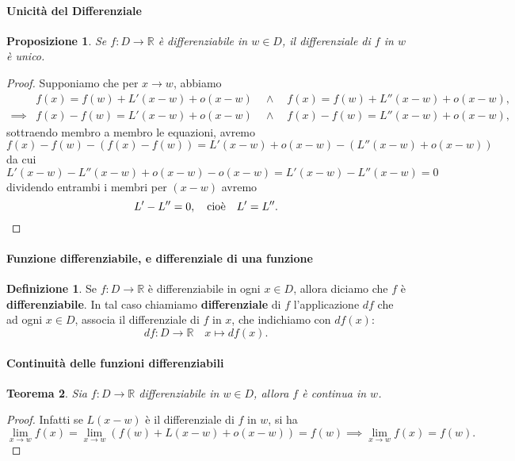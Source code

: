 \documentclass{article}
\theoremstyle{plain}
\newtheorem{thm}{Teorema}[section]
\newtheorem{prop}[thm]{Proposizione}
\theoremstyle{definition}
\newtheorem{defn}{Definizione}[section]
\theoremstyle{remark}
\begin{document}
\vspace{10pt}

\paragraph{Unicità del Differenziale}
\begin{bxthm}
\begin{prop}
    Se $f:D\to\mathbb{R}$ è differenziabile in $w\in D$, il differenziale di $f$ in $w$ è unico.
\end{prop}
\end{bxthm}
\begin{proof}
    Supponiamo che per $x\to w$, abbiamo 
    \begin{align*}
        &f(x)=f(w)+L'(x-w)+o(x-w)\quad\land\quad f(x)=f(w)+L''(x-w)+o(x-w),\\
        \implies &f(x)-f(w)=L'(x-w)+o(x-w)\quad\land\quad f(x)-f(w)=L''(x-w)+o(x-w),
    \end{align*}
    sottraendo membro a membro le equazioni, avremo
    \[f(x)-f(w)-(f(x)-f(w))=L'(x-w)+o(x-w)-(L''(x-w)+o(x-w))\]
    da cui
    \[L'(x-w)-L''(x-w)+o(x-w)-o(x-w)=L'(x-w)-L''(x-w)=0\]
    dividendo entrambi i membri per $(x-w)$ avremo 
    \[L'-L''=0,\quad\textup{cioè}\quad L'=L''.\]
\end{proof}

\vspace{10pt}

\paragraph{Funzione differenziabile, e differenziale di una funzione}
\begin{bxthm}
\begin{defn}
    Se $f:D\to\mathbb{R}$ è differenziabile in ogni $x\in D$, allora diciamo che $f$ è \textbf{differenziabile}.
    In tal caso chiamiamo \textbf{differenziale} di $f$ l'applicazione $df$ che ad ogni $x\in D$, associa il differenziale di $f$ in $x$, che indichiamo con $df(x)$:
    \[df:D\to\mathbb{R}\quad x\mapsto df(x).\]
\end{defn}
\end{bxthm}

\vspace{10pt}

\paragraph{Continuità delle funzioni differenziabili}
\begin{bxthm}
\begin{thm}
    Sia $f:D\to\mathbb{R}$ differenziabile in $w\in D$, allora $f$ è continua in $w$.
\end{thm}
\end{bxthm}
\begin{proof}
    Infatti se $L(x-w)$ è il differenziale di $f$ in $w$, si ha 
    \[\lim_{x\to w}f(x)=\lim_{x\to w}(f(w)+L(x-w)+o(x-w))=f(w)\implies \lim_{x\to w}f(x)=f(w).\]
\end{proof}
\end{document}
